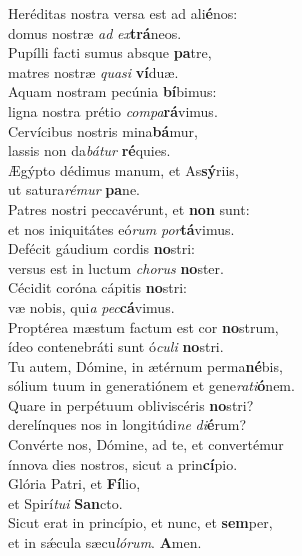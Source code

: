 \evenverse Heréditas nostra versa est ad ali\textbf{é}nos:~\*\\
\evenverse domus nostræ \textit{ad} \textit{ex}\textbf{trá}neos.\\
\oddverse Pupílli facti sumus absque \textbf{pa}tre,~\*\\
\oddverse matres nostræ \textit{qua}\textit{si} \textbf{ví}duæ.\\
\evenverse Aquam nostram pecúnia \textbf{bí}bimus:~\*\\
\evenverse ligna nostra prétio \textit{com}\textit{pa}\textbf{rá}vimus.\\
\oddverse Cervícibus nostris mina\textbf{bá}mur,~\*\\
\oddverse lassis non da\textit{bá}\textit{tur} \textbf{ré}quies.\\
\evenverse Ægýpto dédimus manum, et As\textbf{sý}riis,~\*\\
\evenverse ut satura\textit{ré}\textit{mur} \textbf{pa}ne.\\
\oddverse Patres nostri peccavérunt, et \textbf{non} sunt:~\*\\
\oddverse et nos iniquitátes eó\textit{rum} \textit{por}\textbf{tá}vimus.\\
\evenverse Defécit gáudium cordis \textbf{no}stri:~\*\\
\evenverse versus est in luctum \textit{cho}\textit{rus} \textbf{no}ster.\\
\oddverse Cécidit coróna cápitis \textbf{no}stri:~\*\\
\oddverse væ nobis, qui\textit{a} \textit{pec}\textbf{cá}vimus.\\
\evenverse Proptérea mæstum factum est cor \textbf{no}strum,~\*\\
\evenverse ídeo contenebráti sunt ó\textit{cu}\textit{li} \textbf{no}stri.\\
\oddverse Tu autem, Dómine, in ætérnum perma\textbf{né}bis,~\*\\
\oddverse sólium tuum in generatiónem et gene\textit{ra}\textit{ti}\textbf{ó}nem.\\
\evenverse Quare in perpétuum obliviscéris \textbf{no}stri?~\*\\
\evenverse derelínques nos in longitúdi\textit{ne} \textit{di}\textbf{é}rum?\\
\oddverse Convérte nos, Dómine, ad te, et convertémur~\*\\
\oddverse ínnova dies nostros, sicut a prin\textbf{cí}pio.\\
\evenverse Glória Patri, et \textbf{Fí}lio,~\*\\
\evenverse et Spirí\textit{tu}\textit{i} \textbf{San}cto.\\
\oddverse Sicut erat in princípio, et nunc, et \textbf{sem}per,~\*\\
\oddverse et in sǽcula sæcu\textit{ló}\textit{rum}. \textbf{A}men.\\

